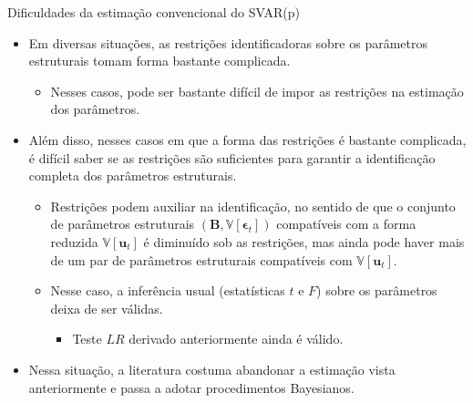 \documentclass[11pt]{beamer}
\begin{document}
\begin{frame}{Dificuldades da estimação convencional do SVAR(p)}
\begin{itemize}
	\item Em diversas situações, as restrições identificadoras sobre os parâmetros estruturais tomam forma bastante complicada.
	\begin{itemize}
		\item Nesses casos, pode ser bastante difícil de impor as restrições na estimação dos parâmetros.
	\end{itemize}
	\item Além disso, nesses casos em que a forma das restrições é bastante complicada, é difícil saber se as restrições são suficientes para garantir a identificação completa dos parâmetros estruturais.
	\begin{itemize}
		\item Restrições podem {\color{blue}auxiliar na identificação}, no sentido de que o conjunto de parâmetros estruturais $(\boldsymbol{B}, \mathbb{V}[\boldsymbol{\epsilon}_t])$ compatíveis com a forma reduzida $\mathbb{V}[\boldsymbol{u}_t]$ é diminuído sob as restrições, mas ainda pode haver mais de um par de parâmetros estruturais compatíveis com  $\mathbb{V}[\boldsymbol{u}_t]$.
		\item Nesse caso, a inferência usual (estatísticas $t$ e $F$) {\color{blue}sobre os parâmetros} deixa de ser válidas.
		\begin{itemize}
			\item Teste $LR$ derivado anteriormente ainda é válido.
		\end{itemize}
	\end{itemize}
	\item Nessa situação, a literatura costuma abandonar a estimação vista anteriormente e passa a adotar {\color{blue}procedimentos Bayesianos}.

\end{itemize}
\end{frame}
\end{document}
